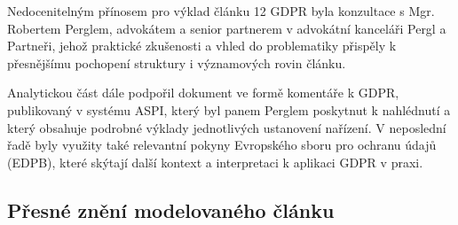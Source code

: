 Nedocenitelným přínosem pro výklad článku 12 GDPR byla konzultace s Mgr. Robertem Perglem, advokátem a senior partnerem v advokátní kanceláři Pergl a Partneři, jehož praktické zkušenosti a vhled do problematiky přispěly k přesnějšímu pochopení struktury i významových rovin článku. 

Analytickou část dále podpořil dokument ve formě komentáře k GDPR, publikovaný v systému ASPI, který byl panem Perglem poskytnut k nahlédnutí a který obsahuje podrobné výklady jednotlivých ustanovení nařízení. V neposlední řadě byly využity také relevantní pokyny Evropského sboru pro ochranu údajů (EDPB), které skýtají další kontext a interpretaci k aplikaci GDPR v praxi. 


\subsection{Přesné znění modelovaného článku}
\label{sec:presne-zneni-modelovaneho-clanku}
